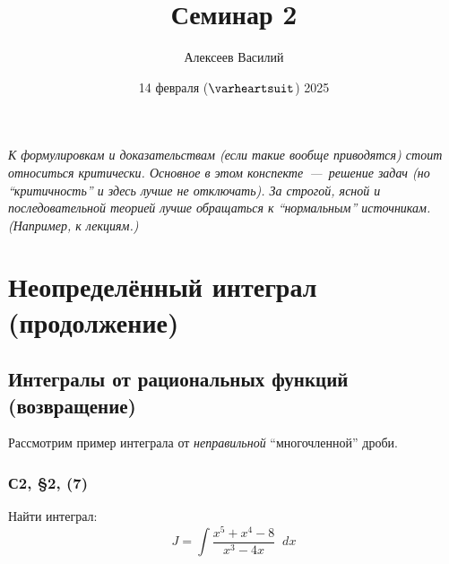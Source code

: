 \documentclass[a4paper,12pt]{article}
\author{Алексеев Василий}
\title{Семинар 2}
\date{14 февраля ($\heart$) 2025}
\newcommand{\diff}{\mathop{}\!d}
\begin{document}
  \maketitle
  
  \tableofcontents

  \thispagestyle{empty}
  
  \newpage
  
  
  
  \vspace*{\fill}
  
  \noindent
  \emph{
    К формулировкам и доказательствам (если такие вообще приводятся) стоит относиться критически.
    Основное в этом конспекте~---~решение задач (но ``критичность'' и здесь лучше не отключать).
    За строгой, ясной и последовательной теорией лучше обращаться к ``нормальным'' источникам.
    (Например, к лекциям.)
  }
  
  \vspace*{\fill}
  
  \thispagestyle{empty}
  
  \newpage
  
  

  \section{Неопределённый интеграл (продолжение)}

  \subsection{Интегралы от рациональных функций (возвращение)}

  Рассмотрим пример интеграла от \emph{неправильной} ``многочленной'' дроби.
  
  \subsubsection{С2, \S 2, (7)}

  Найти интеграл:
  \begin{equation}\label{eq:2-2(7)-int}
    J = \int \frac{x^5 + x^4 - 8}{x^3 - 4x} \diff x
  \end{equation}
  
\end{document}
